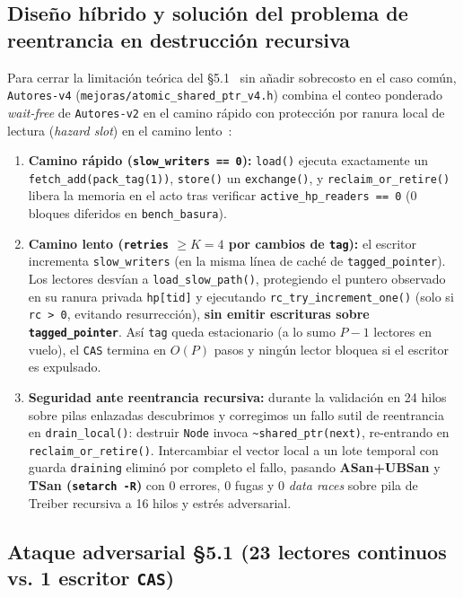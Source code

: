 \documentclass[11pt,a4paper]{article}
\begin{document}
\subsection{Diseño híbrido y solución del problema de reentrancia en destrucción recursiva}
Para cerrar la limitación teórica del \S 5.1~\cite{dewolff2024waitfree} sin añadir sobrecosto en el caso común, \texttt{Autores-v4} (\texttt{mejoras/atomic\_shared\_ptr\_v4.h}) combina el conteo ponderado \emph{wait-free} de \texttt{Autores-v2} en el camino rápido con protección por ranura local de lectura (\emph{hazard slot}) en el camino lento~\cite{kogan2012methodology,timnat2014simulation,nikolaev2024crystalline}:
\begin{enumerate}
  \item \textbf{Camino rápido (\texttt{slow\_writers == 0}):} \texttt{load()} ejecuta exactamente un \texttt{fetch\_add(pack\_tag(1))}, \texttt{store()} un \texttt{exchange()}, y \texttt{reclaim\_or\_retire()} libera la memoria en el acto tras verificar \texttt{active\_hp\_readers == 0} (0 bloques diferidos en \texttt{bench\_basura}).
  \item \textbf{Camino lento (\texttt{retries} $\ge K=4$ por cambios de \texttt{tag}):} el escritor incrementa \texttt{slow\_writers} (en la misma línea de caché de \texttt{tagged\_pointer}). Los lectores desvían a \texttt{load\_slow\_path()}, protegiendo el puntero observado en su ranura privada \texttt{hp[tid]} y ejecutando \texttt{rc\_try\_increment\_one()} (solo si \texttt{rc > 0}, evitando resurrección), \textbf{sin emitir escrituras sobre \texttt{tagged\_pointer}}. Así \texttt{tag} queda estacionario (a lo sumo $P-1$ lectores en vuelo), el \texttt{CAS} termina en $O(P)$ pasos y ningún lector bloquea si el escritor es expulsado.
  \item \textbf{Seguridad ante reentrancia recursiva:} durante la validación en 24 hilos sobre pilas enlazadas descubrimos y corregimos un fallo sutil de reentrancia en \texttt{drain\_local()}: destruir \texttt{Node} invoca \texttt{\~{}shared\_ptr(next)}, re-entrando en \texttt{reclaim\_or\_retire()}. Intercambiar el vector local a un lote temporal con guarda \texttt{draining} eliminó por completo el fallo, pasando \textbf{ASan+UBSan} y \textbf{TSan (\texttt{setarch -R})} con 0 errores, 0 fugas y 0 \emph{data races} sobre pila de Treiber recursiva a 16 hilos y estrés adversarial.
\end{enumerate}

\subsection{Ataque adversarial \S 5.1 (23 lectores continuos vs. 1 escritor \texttt{CAS})}
\end{document}
